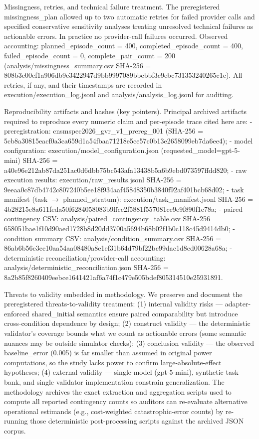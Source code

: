 \documentclass[conference]{IEEEtran}
\begin{document}
Missingness, retries, and technical failure treatment. The preregistered missingness\_plan allowed up to two automatic retries for failed provider calls and specified conservative sensitivity analyses treating unresolved technical failures as actionable errors. In practice no provider-call failures occurred. Observed accounting: planned\_episode\_count = 400, completed\_episode\_count = 400, failed\_episode\_count = 0, complete\_pair\_count = 200 (analysis/missingness\_summary.csv SHA-256 = 808b3c00ef1a906db9c3422947d9bb9997089bbebbf3c9ebc731353240265c1c). All retries, if any, and their timestamps are recorded in execution/execution\_log.jsonl and analysis/analysis\_log.jsonl for auditing.

Reproducibility artifacts and hashes (key pointers). Principal archived artifacts required to reproduce every numeric claim and per-episode trace cited here are:
- preregistration: cnsmspec2026\_gvr\_v1\_prereg\_001 (SHA-256 = 5cb8a30815eacf0a3ca659d1a54fbaa71218e5ce57c0b13e2658099eb7da6ee4);
- model configuration: execution/model\_configuration.json (requested\_model=gpt-5-mini) SHA-256 = a40e96e212ab87da251ac0d6dbb75bc543afa13438b5a6b9ebd073597ffdd820;
- raw execution results: execution/raw\_results.jsonl SHA-256 = 9eeaa0c87db4742c807240b5ee18f934aaf45848350b3840f92af401bcb68d02;
- task manifest (task \ensuremath{\rightarrow} planned\_stratum): execution/task\_manifest.jsonl SHA-256 = 4b28215e8a611feda50f6284058083b9ffcc2f5881f557081ce9e9f890f1c78a;
- paired contingency CSV: analysis/paired\_contingency\_table.csv SHA-256 = 658051bae1f10d90aed1728b8d20dd3700a5694b68b02f1b0c118c45d9414db0;
- condition summary CSV: analysis/condition\_summary.csv SHA-256 = 86ab6b56e3ec10aa54aa08480a8e1ef31b64d79bf22bc99dac1d8ed00628a68a;
- deterministic reconciliation/provider-call accounting: analysis/deterministic\_reconciliation.json SHA-256 = 8a2b85f8260409eebce1641421af6a74f1c479e505bdef805314510e25931891.

Threats to validity embedded in methodology. We preserve and document the preregistered threats-to-validity treatment: (1) internal validity risks --- adapter-enforced shared\_initial semantics ensure paired comparability but introduce cross-condition dependence by design; (2) construct validity --- the deterministic validator's coverage bounds what we count as actionable errors (some semantic nuances may be outside simulator checks); (3) conclusion validity --- the observed baseline\_error (0.005) is far smaller than assumed in original power computations, so the study lacks power to confirm large-absolute-effect hypotheses; (4) external validity --- single-model (gpt-5-mini), synthetic task bank, and single validator implementation constrain generalization. The methodology archives the exact extraction and aggregation scripts used to compute all reported contingency counts so auditors can re-evaluate alternative operational estimands (e.g., cost-weighted catastrophic-error counts) by re-running those deterministic post-processing scripts against the archived JSON corpus.
\end{document}
